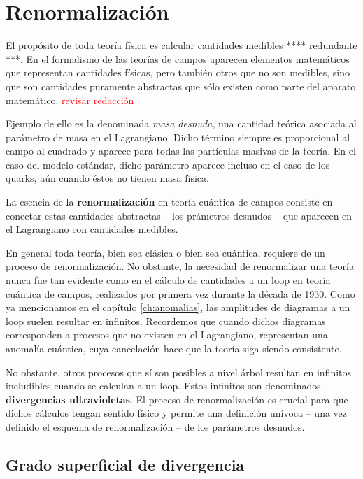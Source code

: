 \chapter{Renormalización}
\label{ch:renormalizacion}

El propósito de toda teoría física es calcular cantidades medibles **** redundante ***. En el formalismo de las teorías de campos aparecen elementos matemáticos que representan cantidades físicas, pero también otros que no son medibles, sino que son cantidades puramente abstractas que sólo existen como parte del aparato matemático. \textcolor{red}{revisar redacción}

Ejemplo de ello es la denominada \emph{masa desnuda}, una cantidad teórica asociada al parámetro de masa en el Lagrangiano. Dicho término siempre es proporcional al campo al cuadrado y aparece para todas las partículas masivas de la teoría. En el caso del modelo estándar, dicho parámetro aparece incluso en el caso de los quarks, aún cuando éstos no tienen masa física.

La esencia de la \textbf{renormalización} en teoría cuántica de campos consiste en conectar estas cantidades abstractas -- los prámetros desnudos -- que aparecen en el Lagrangiano con cantidades medibles. 

En general toda teoría, bien sea clásica o bien sea cuántica, requiere de un proceso de renormalización. No obstante, la necesidad de renormalizar una teoría nunca fue tan evidente como en el cálculo de cantidades a un loop en teoría cuántica de campos, realizados por primera vez durante la década de 1930. Como ya mencionamos en el capítulo \ref{ch:anomalias}, las amplitudes de diagramas a un loop suelen resultar en infinitos. Recordemos que cuando dichos diagramas corresponden a procesos que no existen en el Lagrangiano, representan una anomalía cuántica, cuya cancelación hace que la teoría siga siendo consistente.


No obstante, otros procesos que sí son posibles a nivel árbol resultan en infinitos ineludibles cuando se calculan a un loop. Estos infinitos son denominados \textbf{divergencias ultravioletas}. El proceso de renormalización es crucial para que dichos cálculos tengan sentido físico y permite una definición unívoca -- una vez definido el esquema de renormalización -- de los parámetros desnudos.

\section{Grado superficial de divergencia}

